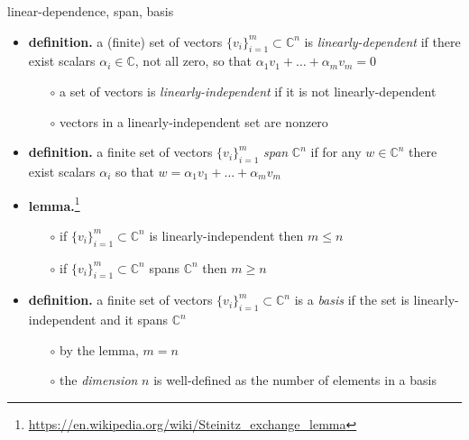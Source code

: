 \documentclass[10pt,hyperref]{beamer}
\newcommand{\CC}{\mathbb{C}}
\begin{document}
\begin{frame}{linear-dependence, span, basis}

\begin{itemize}
\item \textbf{definition.}  a (finite) set of vectors $\{v_i\}_{i=1}^m \subset \CC^n$ is \emph{linearly-dependent} if there exist scalars $\alpha_i \in \CC$, not all zero, so that $\alpha_1 v_1 + \dots + \alpha_m v_m = 0$
    \begin{itemize}
    \item[$\circ$] a set of vectors is \emph{linearly-independent} if it is not linearly-dependent
    \item[$\circ$] vectors in a linearly-independent set are nonzero
    \end{itemize}
\item \textbf{definition.}  a finite set of vectors $\{v_i\}_{i=1}^m$ \emph{span} $\CC^n$ if for any $w\in \CC^n$ there exist scalars $\alpha_i$ so that $w = \alpha_1 v_1 + \dots + \alpha_m v_m$
\item \textbf{lemma.}\footnote{\url{https://en.wikipedia.org/wiki/Steinitz_exchange_lemma}}
    \begin{itemize}
    \item[$\circ$] if $\{v_i\}_{i=1}^m\subset \CC^n$ is linearly-independent then $m \le n$
    \item[$\circ$] if $\{v_i\}_{i=1}^m\subset \CC^n$ spans $\CC^n$ then $m \ge n$
    \end{itemize}
\item \textbf{definition.} a finite set of vectors $\{v_i\}_{i=1}^m \subset \CC^n$ is a \emph{basis} if the set is linearly-independent and it spans $\CC^n$
    \begin{itemize}
    \item[$\circ$] by the lemma, $m=n$
    \item[$\circ$] the \emph{dimension} $n$ is well-defined as the number of elements in a basis
    \end{itemize}
\end{itemize}
\end{frame}
\end{document}
